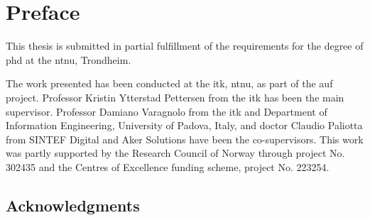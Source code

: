 \chapter*{Preface}

This thesis is submitted in partial fulfillment of the requirements for the degree of \gls{phd} at the \gls{ntnu}, Trondheim.

The work presented has been conducted at the \gls{itk}, \gls{ntnu}, as part of the \gls{auf} project.
Professor Kristin Ytterstad Pettersen from the \gls{itk} has been the main supervisor. 
Professor Damiano Varagnolo from the \gls{itk} and Department of Information Engineering, University of Padova, Italy, and doctor Claudio Paliotta from SINTEF Digital and Aker Solutions have been the co-supervisors.
This work was partly supported by the Research Council of Norway through project No. 302435 and the Centres of Excellence funding scheme, project No. 223254.

\section*{Acknowledgments}

